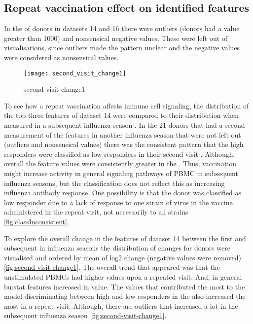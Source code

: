 \subsection{Repeat vaccination effect on identified features}

In the \secondvis of donors in datasets 14 and 16 there were outliers (donors had a value greater than 1000) and nonsensical negative values.
These were left out of visualisations, since outliers made the pattern unclear and the negative values were considered as nonsensical values.

\begin{figure}[htpb]
    \centering
    \texttt{[image: second\_visit\_change1]}
    \caption{second-visit-change1}
    \label{fig:second-visit-change1}
\end{figure}

To see how a repeat vaccination affects immune cell signaling, the distribution of the top three features of dataset 14 were compared to their distribution when measured in a subsequent influenza season .
In the 21 donors that had a second measurement of the features in another influenza season that were not left out (outliers and nonsensical values) there was the consistent pattern that the high responders were classified as low responders in their second visit .
Although, overall the feature values were consistently greater in the \secondvis {}.
Thus, vaccination might increase activity in general signaling pathways of PBMC in subsequent influenza seasons, but the classification does not reflect this as increasing influenza antibody response.
One possibility is that the donor was classified as low responder due to a lack of response to one strain of virus in the vaccine administered in the repeat visit, not necessarily to all strains \autoref{fig:classInconsistent}.

To explore the overall change in the features of dataset 14 between the first and subsequent in influenza seasons the distribution of changes for donors were visualised and ordered by mean of log2 change (negative values were removed) \autoref{fig:second-visit-change1}.
The overall trend that appeared was that the unstimulated PBMCs had higher values upon a repeated visit.
And, in general \gls{bu:stat} features increased in value. The values that contributed the most to the model discriminating between high and low responders in the \firstvis also increased the most in a repeat visit.
Although, there are outliers that increased a lot in the subsequent influenza season \autoref{fig:second-visit-change1}.

